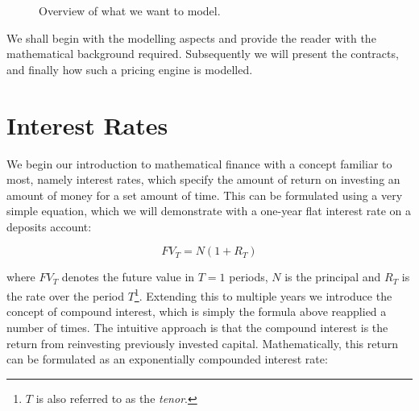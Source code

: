 \begin{figure}[h!]
\begin{center}
\begin{minipage}{\linewidth}
\caption{Overview of what we want to model.}
\label{fig:overview}
\end{minipage}
\end{center}
\end{figure}

We shall begin with the modelling aspects and provide the reader with the
mathematical background required. Subsequently we will present the contracts, 
and finally how such a pricing engine is modelled. 

\section{Interest Rates}

We begin our introduction to mathematical finance with a concept familiar to
most, namely interest rates, which specify the amount of return on
investing an amount of money for a set amount of time. This can be formulated
using a very simple equation, which we will demonstrate with a one-year flat
interest rate on a deposits account:

\begin{equation}\label{eq:lincomp}
FV_T = N (1 + R_T)
\end{equation}

where $FV_T$ denotes the future value in $T=1$ periods, $N$ is the principal
and $R_T$ is the rate over the period $T$\footnote{$T$ is also referred to as the
\emph{tenor}.}. Extending this to multiple years we introduce the 
concept of compound interest, which is simply the formula above reapplied
a number of times. The intuitive approach is
that the compound interest is the return from reinvesting previously invested
capital. Mathematically, this return can be formulated as an exponentially 
compounded interest rate:

